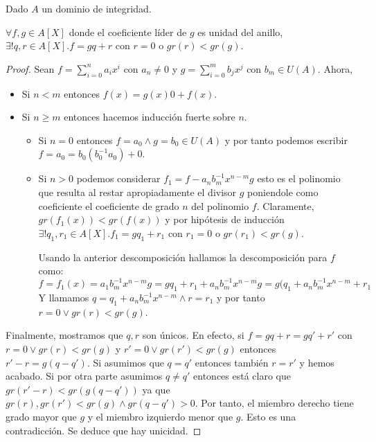 \begin{lemma}
	Dado $A$ un dominio de integridad. 
	
	$\forall f,g \in A[X]$ donde el coeficiente líder de $g$ es unidad del anillo, $\exists!q,r \in A[X]. f = gq + r$ con $r = 0$ o $gr(r) < gr(g)$. 
\end{lemma}
\begin{proof}
	Sean $f = \sum_{i=0}^{n} a_ix^i$ con $a_n \neq 0$ y $g = \sum_{i = 0}^{m} b_jx^j$ con $b_m \in U(A)$. Ahora, 
	
	\begin{itemize}
		\item Si $n < m$ entonces $f(x) = g(x)0 + f(x)$. 
		\item Si $n \ge m$ entonces hacemos inducción fuerte sobre $n$. 
		
		\begin{itemize}
			\item Si $n = 0$ entonces $f = a_0 \land g = b_0 \in U(A)$ y por tanto podemos escribir $f = a_0 = b_0(b_0^{-1}a_0) + 0$. 
			\item Si $n > 0$ podemos considerar $f_1 = f - a_nb_m^{-1}x^{n-m}g$ esto es el polinomio que resulta al restar apropiadamente el divisor $g$ poniendole como coeficiente el coeficiente de grado $n$ del polinomio $f$. Claramente, $gr(f_1(x)) < gr(f(x))$ y por hipótesis de inducción $\exists!q_1,r_1 \in A[X]. f_1 = gq_1+r_1$ con $r_1 = 0$ o $gr(r_1) < gr(g)$. 
			
			Usando la anterior descomposición hallamos la descomposición para $f$ como: $$f = f_1(x) = a_1b_m^{-1}x^{n-m}g = gq_1 + r_1 + a_nb_m^{-1}x^{n-m}g = g(q_1+a_nb_m^{-1}x^{n-m}+r_1$$ Y llamamos $q = q_1+a_nb_m^{-1}x^{n-m} \land r = r_1$ y por tanto $r = 0 \lor gr(r) < gr(g)$.  
		\end{itemize}
	\end{itemize}
	
	Finalmente, mostramos que $q,r$ son únicos. En efecto, si $f = gq+r = gq'+r'$ con $r = 0 \lor gr(r) < gr(g)$ y $r' = 0 \lor gr(r') < gr(g)$ entonces $r'-r = g(q-q')$. Si asumimos que $q = q'$ entonces también $r = r'$ y hemos acabado. Si por otra parte asumimos $q \neq q'$ entonces está claro que $gr(r'-r) < gr(g(q-q'))$ ya que $gr(r),gr(r') < gr(g) \land gr(q-q') > 0$. Por tanto, el miembro derecho tiene grado mayor que $g$ y el miembro izquierdo menor que $g$. Esto es una contradicción. Se deduce que hay unicidad. 
\end{proof}

